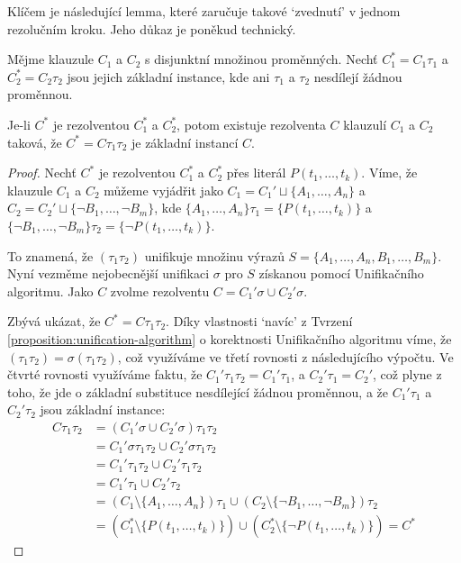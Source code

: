Klíčem je následující lemma, které zaručuje takové `zvednutí' v jednom rezolučním kroku. Jeho důkaz je poněkud technický. 

\begin{lemma}\label{lemma:lifting-lemma}
Mějme klauzule $C_1$ a $C_2$ s disjunktní množinou proměnných. Nechť $C^*_1=C_1\tau_1$ a $C^*_2=C_2\tau_2$ jsou jejich základní instance, kde ani $\tau_1$ a $\tau_2$ nesdílejí žádnou proměnnou.

Je-li $C^*$ je rezolventou $C^*_1$ a $C^*_2$, potom existuje rezolventa $C$ klauzulí $C_1$ a $C_2$ taková, že $C^*=C\tau_1\tau_2$ je základní instancí $C$.
\end{lemma}
\begin{proof}
Nechť $C^*$ je rezolventou $C_1^*$ a $C_2^*$ přes literál $P(t_1,\dots,t_k)$. Víme, že klauzule $C_1$ a $C_2$ můžeme vyjádřit jako $C_1=C_1' \sqcup \{A_1,\dots,A_n\}$ a $C_2=C_2' \sqcup \{\neg B_1,\dots,\neg B_m\}$, kde $\{A_1,\dots,A_n\}\tau_1=\{P(t_1,\dots,t_k)\}$ a $\{\neg B_1,\dots,\neg B_m\}\tau_2=\{\neg P(t_1,\dots,t_k)\}$.

To znamená, že $(\tau_1\tau_2)$ unifikuje množinu výrazů $S=\{A_1,\dots,A_n,B_1,\dots,B_m\}$. Nyní vezměme nejobecnější unifikaci $\sigma$ pro $S$ získanou pomocí Unifikačního algoritmu. Jako $C$ zvolme rezolventu $C=C_1'\sigma \cup C_2'\sigma$.

Zbývá ukázat, že $C^*=C\tau_1\tau_2$. Díky vlastnosti `navíc' z Tvrzení \ref{proposition:unification-algorithm} o korektnosti Unifikačního algoritmu víme, že $(\tau_1\tau_2)=\sigma(\tau_1\tau_2)$, což využíváme ve třetí rovnosti z následujícího výpočtu. Ve čtvrté rovnosti využíváme faktu, že $C_1'\tau_1\tau_2=C_1'\tau_1$, a $C_2'\tau_1=C_2'$, což plyne z toho, že jde o základní substituce nesdílející žádnou proměnnou, a že $C_1'\tau_1$ a $C_2'\tau_2$ jsou základní instance:
\begin{align*}
    C\tau_1\tau_2&= (C_1'\sigma \cup C_2'\sigma)\tau_1\tau_2\\
    &=C_1'\sigma\tau_1\tau_2 \cup C_2'\sigma\tau_1\tau_2\\
    &=C_1'\tau_1\tau_2 \cup C_2'\tau_1\tau_2\\
    &=C_1'\tau_1 \cup C_2'\tau_2\\
    &=(C_1\setminus\{A_1,\dots,A_n\})\tau_1\cup (C_2\setminus\{\neg B_1,\dots,\neg B_m\})\tau_2\\
    &=(C_1^*\setminus\{P(t_1,\dots,t_k)\})\cup(C_2^*\setminus \{\neg P(t_1,\dots,t_k)\})=C^*
\end{align*}
\end{proof}

